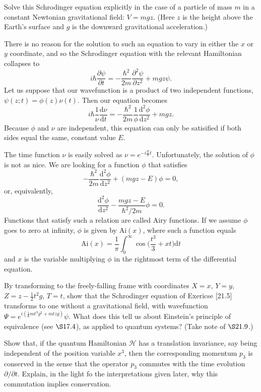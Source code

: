 \documentclass[../road-to-reality.tex]{subfiles}
\begin{document}
\begin{questions}
\question Solve this Schrodinger equation explicitly in the case of a particle
  of mass $m$ in a constant Newtonian gravitational field: $V = mgz$. (Here
  $z$ is the height above the Earth's surface and $g$ is the downward
  gravitational acceleration.)

  \begin{solution}
    There is no reason for the solution to such an equation to vary in either
    the $x$ or $y$ coordinate, and so the Schrodinger equation with the relevant
    Hamiltonian collapses to
    \[
      i\hbar\frac{\partial\psi}{\partial{t}} =
      -\frac{\hbar^2}{2m}\frac{\partial^2\psi}{\partial{z}^2} + mgz\psi.
    \]
    Let us suppose that our wavefunction is a product of two independent
    functions, $\psi(z; t) = \phi(z)\nu(t)$. Then our equation becomes
    \[
      i\hbar\frac{1}{\nu}\frac{\mathrm{d}\nu}{\mathrm{d}t} =
      -\frac{\hbar^2}{2m}\frac{1}{\phi}\frac{\mathrm{d}^2\phi}{\mathrm{d}z^2}
      + mgz.
    \]
    Because $\phi$ and $\nu$ are independent, this equation can only be
    satisified if both sides equal the same, constant value $E$.
    
    The time function $\nu$ is easily solved as $\nu = e^{-i\frac{E}{\hbar}t}$. Unfortunately, the solution of $\phi$ is not as nice. We are looking for a function $\phi$ that satisfies
    \[
    	{-\frac{\hbar^2}{2m}}\frac{\mathrm{d}^2\phi}{\mathrm{d}z^2} + (mgz - E)\phi = 0,
    \]
    or, equivalently,
    \[
    	\frac{\mathrm{d}^2\phi}{\mathrm{d}z^2} - \frac{mgz - E}{\hbar^2/2m}\phi = 0.
    \]
    Functions that satisfy such a relation are called Airy functions. If we assume $\phi$ goes to zero at infinity, $\phi$ is given by $\mathrm{Ai}(x)$, where such a function equals
    \[
    	\mathrm{Ai}(x) = \frac{1}{\pi}\int_0^{\infty}\cos\Big(\frac{t^3}{3}+xt\Big)\mathrm{d}t
    \]
    and $x$ is the variable multiplying $\phi$ in the rightmost term of the differential equation.
  \end{solution}

\question By transforming to the freely-falling frame with coordinates
  $X=x$, $Y=y$, $Z=z-\frac{1}{2}t^2g$, $T=t$, show that the Schrodinger
  equation of Exericse [21.5] transforms to one without a gravitational
  field, with wavefunction $\Psi = e^{i(\frac{1}{6}mt^3g^2+mtzg)}\psi$. What
  does this tell us about Einstein's principle of equivalence (see
  $\S17.4$), as applied to quantum systems? (Take note of $\S21.9$.)

\question Show that, if the quantum Hamiltonian $\mathcal{H}$ has a
  translation invariance, say being independent of the position variable
  $x^3$, then the corresponding momentum $p_3$ is conserved in the sense that
  the operator $p_3$ commutes with the time evolution $\partial/\partial{t}$.
  Explain, in the light fo the interpretations given later, why this
  commutation implies conservation.


\end{questions}
\end{document}
